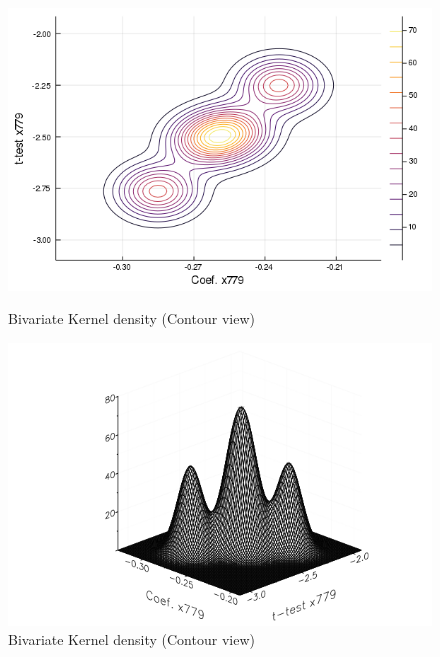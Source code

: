 \documentclass{article}
\begin{document}
\begin{figure}[!ht]
  \centering
  \begin{minipage}[b]{0.46\textwidth}
    \centering
    \includegraphics[width=\textwidth]{contour_x779_b_t.png}
    \caption{Bivariate Kernel density (Contour view)}
  \end{minipage}
  \hfill
  \begin{minipage}[b]{0.53\textwidth}
    \centering
    \includegraphics[width=\textwidth]{wireframe_x779_b_t.png}
    \caption{Bivariate Kernel density (Contour view)}
  \end{minipage}


\end{figure}
\end{document}
